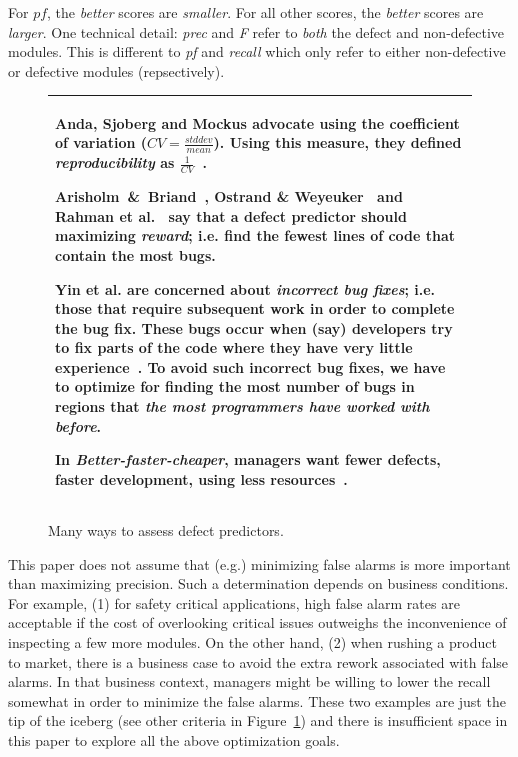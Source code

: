 \documentclass[smallextended]{svjour3}
\newcommand{\fig}[1]{Figure~\ref{fig:#1}}
\begin{document}
For $pf$, the {\em better} scores are {\em smaller}.
For all other scores, the {\em better} scores are {\em larger}.
One technical detail:   {\em prec}
and {\em F} refer to {\em both} the defect and non-defective modules. This is different to {\em pf} and {\em recall} which only
refer to either non-defective or defective modules (repsectively).


\begin{figure}[!b]
\small
\begin{tabular}{|p{.95\linewidth}|}\hline

 Anda, Sjoberg and Mockus advocate using the coefficient of variation ($CV=\frac{stddev}{mean}$).
Using this measure, they defined {\em reproducibility} as $\frac{1}{CV}$~\cite{anda09}.

Arisholm~\&~Briand~\cite{arisholm06},  Ostrand \& Weyeuker~\cite{ostrand04} and Rahman et al.~\cite{rahman12}
say that a defect predictor should maximizing {\em reward}; i.e. find the fewest lines of code
that contain the most bugs.

Yin et al. are concerned about
 {\em incorrect bug fixes}; i.e. those that require subsequent work in order to complete the bug fix.
These bugs occur  when (say) developers try to fix parts of the code
where they have very little experience~\cite{yin11}.  To avoid such incorrect bug fixes, we have to optimize
for finding the most number of bugs in regions that {\em the most programmers have worked with before}.

In {\em Better-faster-cheaper},   managers want
 fewer defects,  faster development,  using less resources~\cite{Green,elrawas10,me07f,me09f}.
\\\hline
\end{tabular}
\caption{Many ways to assess defect predictors.}\label{fig:criteria}
\end{figure}


This paper does not assume that (e.g.) minimizing false alarms is 
more important than maximizing   precision. Such a determination 
depends on   business conditions.
For example,
(1) for safety critical applications, high false alarm rates are  acceptable if the cost
of overlooking  critical issues outweighs the inconvenience of   inspecting a few more
modules. 
On the other hand, (2) when rushing a product to market,  there is a business case to 
avoid the extra rework associated with false alarms.  In that business context, 
managers might be willing to lower the recall somewhat in order to minimize the false alarms.
These two examples are just the tip of the iceberg (see other criteria in \fig{criteria})
and there is insufficient space in this paper to explore all the above optimization goals.
\end{document}
